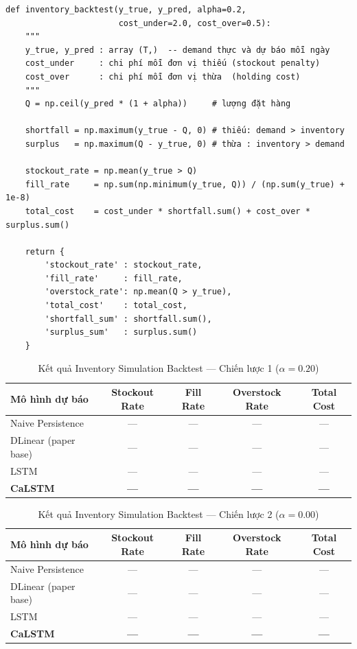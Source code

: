 \documentclass[12pt,a4paper]{report}
\begin{document}
\begin{lstlisting}[caption=Inventory Simulation Backtest]
def inventory_backtest(y_true, y_pred, alpha=0.2,
                       cost_under=2.0, cost_over=0.5):
    """
    y_true, y_pred : array (T,)  -- demand thực và dự báo mỗi ngày
    cost_under     : chi phí mỗi đơn vị thiếu (stockout penalty)
    cost_over      : chi phí mỗi đơn vị thừa  (holding cost)
    """
    Q = np.ceil(y_pred * (1 + alpha))     # lượng đặt hàng

    shortfall = np.maximum(y_true - Q, 0) # thiếu: demand > inventory
    surplus   = np.maximum(Q - y_true, 0) # thừa : inventory > demand

    stockout_rate = np.mean(y_true > Q)
    fill_rate     = np.sum(np.minimum(y_true, Q)) / (np.sum(y_true) + 1e-8)
    total_cost    = cost_under * shortfall.sum() + cost_over * surplus.sum()

    return {
        'stockout_rate' : stockout_rate,
        'fill_rate'     : fill_rate,
        'overstock_rate': np.mean(Q > y_true),
        'total_cost'    : total_cost,
        'shortfall_sum' : shortfall.sum(),
        'surplus_sum'   : surplus.sum()
    }
\end{lstlisting}

\begin{table}[H]
\centering
\caption{Kết quả Inventory Simulation Backtest --- Chiến lược 1 ($\alpha=0.20$)}
\begin{tabular}{lcccc}
\toprule
\textbf{Mô hình dự báo} & \textbf{Stockout Rate} & \textbf{Fill Rate} & \textbf{Overstock Rate} & \textbf{Total Cost} \\
\midrule
Naive Persistence      & --- & --- & --- & --- \\
DLinear (paper base)   & --- & --- & --- & --- \\
LSTM                   & --- & --- & --- & --- \\
\textbf{CaLSTM}        & \textbf{---} & \textbf{---} & \textbf{---} & \textbf{---} \\
\bottomrule
\end{tabular}
\end{table}

\begin{table}[H]
\centering
\caption{Kết quả Inventory Simulation Backtest --- Chiến lược 2 ($\alpha=0.00$)}
\begin{tabular}{lcccc}
\toprule
\textbf{Mô hình dự báo} & \textbf{Stockout Rate} & \textbf{Fill Rate} & \textbf{Overstock Rate} & \textbf{Total Cost} \\
\midrule
Naive Persistence      & --- & --- & --- & --- \\
DLinear (paper base)   & --- & --- & --- & --- \\
LSTM                   & --- & --- & --- & --- \\
\textbf{CaLSTM}        & \textbf{---} & \textbf{---} & \textbf{---} & \textbf{---} \\
\bottomrule
\end{tabular}
\end{table}
\end{document}
